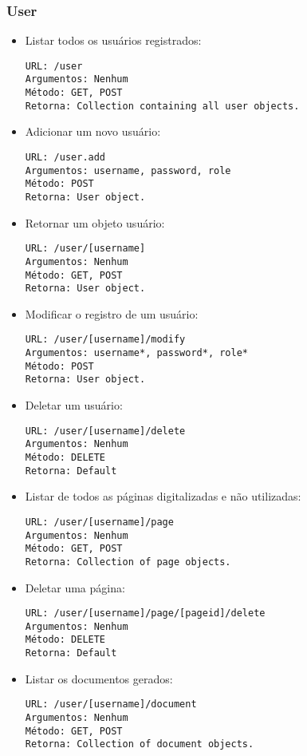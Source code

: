 \subsubsection{User}

\begin{itemize}

\item Listar todos os usuários registrados:
\begin{verbatim}
URL: /user
Argumentos: Nenhum
Método: GET, POST
Retorna: Collection containing all user objects.
\end{verbatim}

\item Adicionar um novo usuário:
\begin{verbatim}
URL: /user.add
Argumentos: username, password, role
Método: POST
Retorna: User object.
\end{verbatim}

\item Retornar um objeto usuário:
\begin{verbatim}
URL: /user/[username]
Argumentos: Nenhum
Método: GET, POST
Retorna: User object.
\end{verbatim}

\item Modificar o registro de um usuário:
\begin{verbatim}
URL: /user/[username]/modify
Argumentos: username*, password*, role*
Método: POST
Retorna: User object.
\end{verbatim}

\item Deletar um usuário:
\begin{verbatim}
URL: /user/[username]/delete
Argumentos: Nenhum
Método: DELETE
Retorna: Default
\end{verbatim}

\item Listar de todos as páginas digitalizadas e não utilizadas: 
\begin{verbatim}
URL: /user/[username]/page
Argumentos: Nenhum
Método: GET, POST
Retorna: Collection of page objects.
\end{verbatim}

\item Deletar uma página: 
\begin{verbatim}
URL: /user/[username]/page/[pageid]/delete
Argumentos: Nenhum
Método: DELETE
Retorna: Default 
\end{verbatim}

\item Listar os documentos gerados:
\begin{verbatim}
URL: /user/[username]/document
Argumentos: Nenhum
Método: GET, POST
Retorna: Collection of document objects.
\end{verbatim}


\end{itemize}
